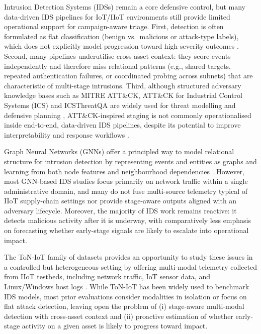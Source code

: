 \documentclass[pdflatex,sn-mathphys-num]{sn-jnl}
\theoremstyle{thmstyleone}%
\theoremstyle{thmstyletwo}%
\theoremstyle{thmstylethree}%
\begin{document}
Intrusion Detection Systems (IDSs) remain a core defensive control, but many data-driven IDS pipelines for IoT/IIoT environments still provide limited operational support for campaign-aware triage. First, detection is often formulated as flat classification (benign vs.\ malicious or attack-type labels), which does not explicitly model progression toward high-severity outcomes \cite{gyamfi2022intrusionIot,villafranca2025ai_enabled_iot_ids,lightbody2024dragon_pi}. Second, many pipelines underutilise cross-asset context: they score events independently and therefore miss relational patterns (e.g., shared targets, repeated authentication failures, or coordinated probing across subnets) that are characteristic of multi-stage intrusions. Third, although structured adversary knowledge bases such as MITRE ATT\&CK, ATT\&CK for Industrial Control Systems (ICS) and ICSThreatQA are widely used for threat modelling and defensive planning \cite{mitreAttack,mitreICS, rani2025icsthreatqa}, ATT\&CK-inspired staging is not commonly operationalised inside end-to-end, data-driven IDS pipelines, despite its potential to improve interpretability and response workflows \cite{roy2023sok_attack,alsada2023attack_sota}.

Graph Neural Networks (GNNs) offer a principled way to model relational structure for intrusion detection by representing events and entities as graphs and learning from both node features and neighbourhood dependencies \cite{sun2024gnnids,wang2025bsgat,nguyen2025elgnn,xu2024selfsupervised,ahanger2025gnn}. However, most GNN-based IDS studies focus primarily on network traffic within a single administrative domain, and many do not fuse multi-source telemetry typical of IIoT supply-chain settings nor provide stage-aware outputs aligned with an adversary lifecycle. Moreover, the majority of IDS work remains reactive: it detects malicious activity after it is underway, with comparatively less emphasis on forecasting whether early-stage signals are likely to escalate into operational impact.

The ToN-IoT family of datasets provides an opportunity to study these issues in a controlled but heterogeneous setting by offering multi-modal telemetry collected from IIoT testbeds, including network traffic, IoT sensor data, and Linux/Windows host logs \cite{alsaedi2020toniot,moustafa2020tonlinux,moustafa2020tonwindows,moustafa2021tonlinuxEval}. While ToN-IoT has been widely used to benchmark IDS models, most prior evaluations consider modalities in isolation or focus on flat attack detection, leaving open the problem of (i) stage-aware multi-modal detection with cross-asset context and (ii) proactive estimation of whether early-stage activity on a given asset is likely to progress toward impact.
\end{document}

